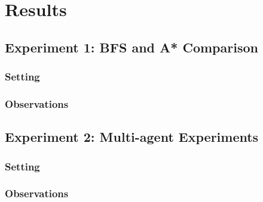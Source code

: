 \documentclass[11pt]{article}
\begin{document}
\section{Results}

\subsection{Experiment 1: BFS and A* Comparison}

\subsubsection{Setting}

\subsubsection{Observations}


\subsection{Experiment 2: Multi-agent Experiments}

\subsubsection{Setting}

\subsubsection{Observations}
\end{document}
